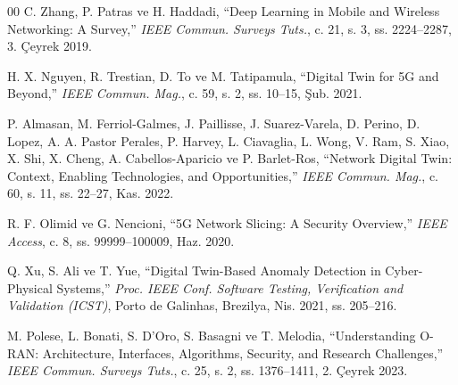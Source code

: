 \documentclass[conference]{IEEEtran}
\begin{document}
\begin{thebibliography}{00}
C. Zhang, P. Patras ve H. Haddadi,
``Deep Learning in Mobile and Wireless Networking: A Survey,''
\emph{IEEE Commun. Surveys Tuts.},
c. 21, s. 3, ss. 2224--2287, 3. Çeyrek 2019.

H. X. Nguyen, R. Trestian, D. To ve M. Tatipamula,
``Digital Twin for 5G and Beyond,''
\emph{IEEE Commun. Mag.},
c. 59, s. 2, ss. 10--15, Şub. 2021.

P. Almasan, M. Ferriol-Galmes, J. Paillisse, J. Suarez-Varela,
D. Perino, D. Lopez, A. A. Pastor Perales, P. Harvey, L. Ciavaglia,
L. Wong, V. Ram, S. Xiao, X. Shi, X. Cheng, A. Cabellos-Aparicio
ve P. Barlet-Ros,
``Network Digital Twin: Context, Enabling Technologies, and Opportunities,''
\emph{IEEE Commun. Mag.},
c. 60, s. 11, ss. 22--27, Kas. 2022.

R. F. Olimid ve G. Nencioni,
``5G Network Slicing: A Security Overview,''
\emph{IEEE Access},
c. 8, ss. 99999--100009, Haz. 2020.

Q. Xu, S. Ali ve T. Yue,
``Digital Twin-Based Anomaly Detection in Cyber-Physical Systems,''
\emph{Proc. IEEE Conf. Software Testing, Verification and Validation (ICST)},
Porto de Galinhas, Brezilya, Nis. 2021, ss. 205--216.

M. Polese, L. Bonati, S. D'Oro, S. Basagni ve T. Melodia,
``Understanding O-RAN: Architecture, Interfaces, Algorithms, Security,
and Research Challenges,''
\emph{IEEE Commun. Surveys Tuts.},
c. 25, s. 2, ss. 1376--1411, 2. Çeyrek 2023.

\end{thebibliography}
\end{document}
